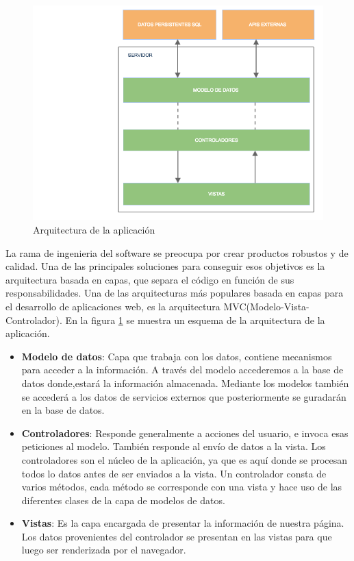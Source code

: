 \begin{figure}
\begin{center}
\includegraphics[width=1.0\textwidth]{imagenes/arquitectura.png}
\caption{Arquitectura de la aplicación}
\label{arquitectura}
\end{center}
\end{figure}



La rama de ingenieria del software se preocupa por crear productos robustos y de calidad. Una de las principales soluciones para conseguir esos objetivos es la arquitectura basada en capas, que separa el código en función de sus responsabilidades. Una de las arquitecturas más populares basada en capas para el desarrollo de aplicaciones web, es la arquitectura MVC(Modelo-Vista-Controlador). En la figura \ref{arquitectura} se muestra un esquema de la arquitectura de la aplicación.

\begin{itemize}

\item \textbf{Modelo de datos}: Capa que trabaja con los datos, contiene mecanismos para acceder a la información. A través del modelo accederemos a la base de datos donde,estará la información almacenada. Mediante los modelos también se accederá a los datos de servicios externos que posteriormente se guradarán en la base de datos.

\item \textbf{Controladores}: Responde generalmente a acciones del usuario, e invoca esas peticiones al modelo. También responde al envío de datos a la vista. Los controladores son el núcleo de la aplicación, ya que es aquí donde se procesan todos lo datos antes de ser enviados a la vista. Un controlador consta de varios métodos, cada método se corresponde con una vista y hace uso de las diferentes clases de la capa de modelos de datos. 

\item \textbf{Vistas}: Es la capa encargada de presentar la información de nuestra página. Los datos provenientes del controlador se presentan en las vistas para que luego ser renderizada por el navegador.

\end{itemize}

